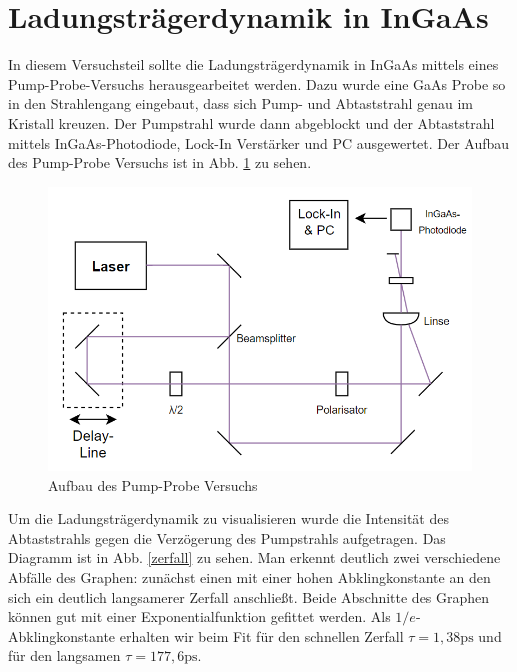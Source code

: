 	
\section{Ladungsträgerdynamik in InGaAs}	
In diesem Versuchsteil sollte die Ladungsträgerdynamik in InGaAs mittels eines Pump-Probe-Versuchs herausgearbeitet werden. Dazu wurde eine GaAs Probe so in den Strahlengang eingebaut, dass sich Pump- und Abtaststrahl genau im Kristall kreuzen. Der Pumpstrahl wurde dann abgeblockt und der Abtaststrahl mittels InGaAs-Photodiode, Lock-In Verstärker und PC ausgewertet. Der Aufbau des Pump-Probe Versuchs ist in Abb. \ref{pp_aufbau} zu sehen.

\begin{figure}[h]
	\begin{center}
		\includegraphics[width=14cm]{Abb/pumpprobe_aufbau.png}
		\caption{Aufbau des Pump-Probe Versuchs}
		\label{pp_aufbau}
	\end{center}
\end{figure}

Um die Ladungsträgerdynamik zu visualisieren wurde die Intensität des Abtaststrahls gegen die Verzögerung des Pumpstrahls aufgetragen. Das Diagramm ist in Abb. \ref{zerfall} zu sehen. Man erkennt deutlich zwei verschiedene Abfälle des Graphen: zunächst einen mit einer hohen Abklingkonstante an den sich ein deutlich langsamerer Zerfall anschließt. Beide Abschnitte des Graphen können gut mit einer Exponentialfunktion gefittet werden. Als $1/e$-Abklingkonstante erhalten wir beim Fit für den schnellen Zerfall $\tau=1,38\si{\pico\second}$ und für den langsamen $\tau=177,6\si{\pico\second}$. 

